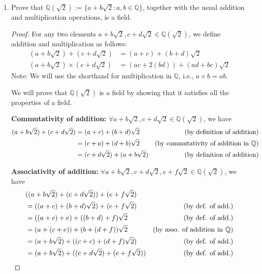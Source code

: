 \documentclass[10pt]{article}
\newcommand{\Q}{\mathbb{Q}}
\newenvironment{problem}[2][Problem]{\begin{trivlist}
\item[\hskip \labelsep {\bfseries #1}\hskip \labelsep {\bfseries #2.}]}{\end{trivlist}}
\begin{document}
\newpage
\begin{problem}{4}\;
	\begin{enumerate}
		\item Prove that $ \Q(\sqrt{2}):=\{ a+b\sqrt{2} : a,b \in \Q \} $, together with the usual addition and multiplication operations, is a field.
            \begin{proof}
                For any two elements \( a + b\sqrt{2}, c + d\sqrt{2} \in \Q(\sqrt{2}) \), we define addition and multiplication as follows:
                \begin{align*}
                    (a + b\sqrt{2}) + (c + d\sqrt{2}) &= (a + c) + (b + d)\sqrt{2} \\
                    (a + b\sqrt{2}) \times (c + d\sqrt{2}) &= (ac + 2(bd)) + (ad + bc)\sqrt{2} 
                \end{align*}
                Note: We will use the shorthand for multiplication in $\Q$, i.e., \( a \times b = ab \).
                
                We will prove that $ \Q(\sqrt{2}) $ is a field by showing that it satisfies all the properties of a field.

                \textbf{Commutativity of addition:} \( \forall a + b\sqrt{2}, c + d\sqrt{2} \in \Q(\sqrt{2}) \), we have
                \begin{align*}
                    (a + b\sqrt{2}) + (c + d\sqrt{2}) &= (a + c) + (b + d)\sqrt{2} & \text{(by definition of addition)} \hfill \\
                                                      &= (c + a) + (d + b)\sqrt{2} & \text{(by commutativity of addition in $\Q$)} \hfill \\
                                                      &= (c + d\sqrt{2}) + (a + b\sqrt{2}) & \text{(by definition of addition)} \hfill
                \end{align*}

                \textbf{Associativity of addition:} \( \forall a + b\sqrt{2}, c + d\sqrt{2}, e + f\sqrt{2} \in \Q(\sqrt{2}) \), we have
                \begin{align*}
                    & ((a + b\sqrt{2}) + (c + d\sqrt{2})) + (e + f\sqrt{2}) \\
                    &= ((a + c) + (b + d)\sqrt{2}) + (e + f\sqrt{2}) & \text{(by def. of add.)} \hfill \\
                                                                         &= ((a + c) + e) + ((b + d) + f)\sqrt{2} & \text{(by def. of add.)} \hfill \\
                                                                         &= (a + (c + e)) + (b + (d + f)) \sqrt{2} & \text {(by asso. of addition in $\Q$)} \\
                                                                         &= (a + b\sqrt{2}) + ((c + e) + (d + f)\sqrt{2}) & \text{(by def. of add.)} \hfill \\
                                                                         &= (a + b\sqrt{2}) + ((c + d\sqrt{2}) + (e + f\sqrt{2})) & \text{(by def. of add.)} \hfill
                \end{align*}


\end{proof}
\end{enumerate}
\end{problem}
\end{document}

